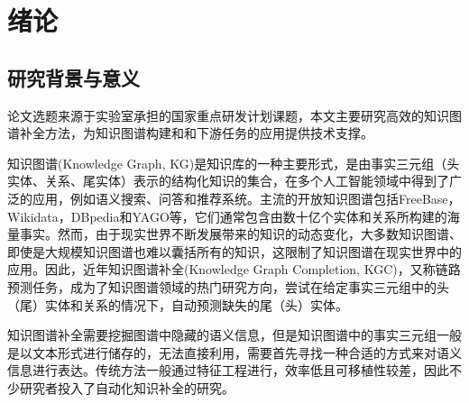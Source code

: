 \chapter{绪论}

\section{研究背景与意义}
论文选题来源于实验室承担的国家重点研发计划课题，本文主要研究高效的知识图谱补全方法，为知识图谱构建和和下游任务的应用提供技术支撑。

知识图谱(Knowledge Graph, KG)是知识库的一种主要形式，是由事实三元组（头实体、关系、尾实体）表示的结构化知识的集合，在多个人工智能领域中得到了广泛的应用，例如语义搜索、问答和推荐系统。主流的开放知识图谱包括FreeBase，Wikidata，DBpedia和YAGO等，它们通常包含由数十亿个实体和关系所构建的海量事实。然而，由于现实世界不断发展带来的知识的动态变化，大多数知识图谱、即使是大规模知识图谱也难以囊括所有的知识，这限制了知识图谱在现实世界中的应用。因此，近年知识图谱补全(Knowledge Graph Completion, KGC)，又称链路预测任务，成为了知识图谱领域的热门研究方向，尝试在给定事实三元组中的头（尾）实体和关系的情况下，自动预测缺失的尾（头）实体。



知识图谱补全需要挖掘图谱中隐藏的语义信息，但是知识图谱中的事实三元组一般是以文本形式进行储存的，无法直接利用，需要首先寻找一种合适的方式来对语义信息进行表达。传统方法一般通过特征工程进行，效率低且可移植性较差，因此不少研究者投入了自动化知识补全的研究。

